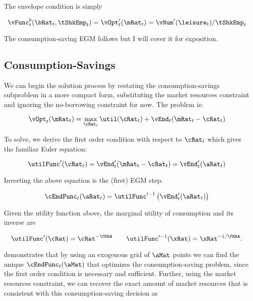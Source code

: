 \documentclass[\econtexRoot/SequentialEGM]{subfiles}
\begin{document}
The envelope condition is simply

\begin{equation}
        \vFunc_{t}^{b}(\bRat_{t}, \tShkEmp_{t}) = \vOpt_{t}'(\mRat_{t}) =
        \vNum'(\leisure_{t})/\tShkEmp_{t}
\end{equation}

The consumption-saving EGM follows \cite{Carroll2006-wq} but I will cover it for exposition.

\subsection{Consumption-Savings}

We can begin the solution process by restating the consumption-savings subproblem in a more compact form, substituting the market resources constraint and ignoring the no-borrowing constraint for now. The problem is:

\begin{equation}
        \vOpt_{t}(\mRat_{t}) = \max_{\cRat_{t}} \util(\cRat_{t}) +
        \vEnd_{t}(\mRat_{t}-\cRat_{t})
\end{equation}

To solve, we derive the first order condition with respect to $\cRat_{t}$ which gives the familiar Euler equation:

\begin{equation}
        \utilFunc'(\cRat_t) = \vEnd_{t}'(\mRat_{t} - \cRat_{t}) =
        \vEnd_{t}'(\aRat_{t})
\end{equation}

Inverting the above equation is the (first) EGM step.

\begin{equation}
        \cEndFunc_{t}(\aRat_{t}) = \utilFunc'^{-1}\left( \vEnd_{t}'(\aRat_{t})
        \right)
\end{equation}

Given the utility function above, the marginal utility of consumption and its inverse are

\begin{equation}
        \utilFunc'(\cRat) = \cRat^{-\CRRA} \qquad \utilFunc'^{-1}(\xRat) =
        \xRat^{-1/\CRRA}.
\end{equation}

\cite{Carroll2006-wq} demonstrates that by using an exogenous grid of $\aMat$ points we can find the unique
$\cEndFunc_{t}(\aMat)$ that optimizes the consumption-saving problem, since the first order condition is necessary and sufficient.
Further, using the market resources constraint, we can recover the exact amount
of market resources that is consistent with this consumption-saving decision as
\end{document}
